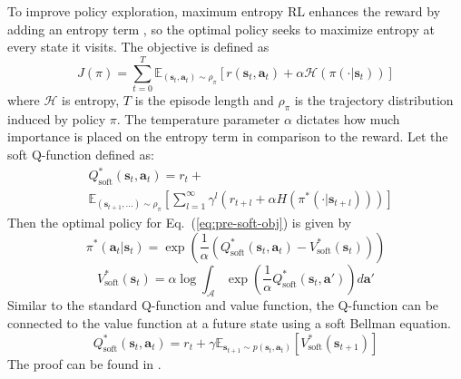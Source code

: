 To improve policy exploration, maximum entropy RL enhances the reward by adding an entropy term \cite{MaxEntIRL, SoftQ, SAC}, so the optimal policy seeks to maximize entropy at every state it visits. The objective is defined as
\begin{equation}
    J(\pi) =  \sum_{t=0}^{T} \mathbb{E}_{(\mathbf{s}_t, \mathbf{a}_t) \sim \rho_\pi} \left[ r(\mathbf{s}_t, \mathbf{a}_t) + \alpha \mathcal{H}(\pi(\cdot | \mathbf{s}_t)) \right]
    \label{eq:pre-soft-obj}
\end{equation}
where $\mathcal{H}$ is entropy, $T$ is the episode length and $\rho_\pi$ is the trajectory distribution induced by policy $\pi$.
The temperature parameter $\alpha$ dictates how much importance is placed on the entropy term in comparison to the reward. 
Let the soft Q-function defined as:
\begin{equation}
\begin{split}
    & Q^*_{\text{soft}}(\mathbf{s}_t, \mathbf{a}_t) = r_t + \\
    & \mathbb{E}_{(\mathbf{s}_{t+1}, \dots) \sim \rho_\pi} 
    \left[ \sum_{l=1}^\infty \gamma^l \left( r_{t+l} + \alpha H\left(\pi^*(\cdot | \mathbf{s}_{t+l})\right) \right) \right]
\end{split}
\end{equation}
Then the optimal policy for Eq.~(\ref{eq:pre-soft-obj}) is given by
\begin{equation}
\label{eq:pre-soft-policy}
    \pi^*(\mathbf{a}_t | \mathbf{s}_t) = \exp \left( \frac{1}{\alpha} \left( Q^*_{\text{soft}}(\mathbf{s}_t, \mathbf{a}_t) - V^*_{\text{soft}}(\mathbf{s}_t) \right) \right)
\end{equation}
\begin{equation}
\label{eq:pre-soft-v}
    V^*_{\text{soft}}(\mathbf{s}_t) = \alpha \log \int_{\mathcal{A}} \exp \left( \frac{1}{\alpha} Q^*_{\text{soft}}(\mathbf{s}_t, \mathbf{a}') \right) d\mathbf{a}'
\end{equation}
Similar to the standard Q-function and value function, the Q-function can be connected to the value function at a future state using a soft Bellman equation.
\begin{equation}
\label{eq:pre-soft-update}
    Q^*_{\text{soft}}(\mathbf{s}_t, \mathbf{a}_t) = r_t + \gamma \mathbb{E}_{\mathbf{s}_{t+1} \sim p(\mathbf{s}_t, \mathbf{a}_t)} \left[ V^*_{\text{soft}}(\mathbf{s}_{t+1}) \right]
\end{equation}
The proof can be found in \cite{MaxEntIRL, SoftQ}.



